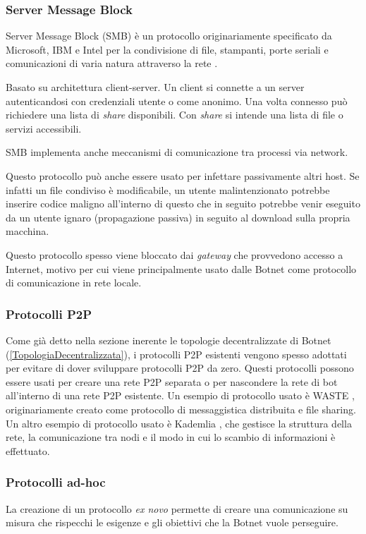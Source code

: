 \subsubsection{Server Message Block}
Server Message Block (SMB) è un protocollo  originariamente specificato da Microsoft, IBM e Intel per la condivisione di file, stampanti, porte seriali e comunicazioni di varia natura attraverso la rete \cite{SMB}.

Basato su architettura client-server. Un client si connette a un server autenticandosi con credenziali utente o come anonimo. Una volta connesso può richiedere una lista di \textit{share} disponibili. Con \textit{share} si intende una lista di file o servizi accessibili.

SMB implementa anche meccanismi di comunicazione tra processi via network.

Questo protocollo può anche essere usato per infettare passivamente altri host. Se infatti un file condiviso è modificabile, un utente malintenzionato potrebbe inserire codice maligno all'interno di questo  che in seguito  potrebbe venir eseguito da un utente ignaro (propagazione passiva) in seguito al download  sulla propria macchina.

Questo protocollo spesso viene bloccato dai \textit{gateway} che provvedono accesso a Internet, motivo per cui viene principalmente usato dalle Botnet come protocollo di comunicazione in rete locale.

\subsubsection{Protocolli P2P}
Come già detto nella sezione inerente le topologie decentralizzate di Botnet (\ref{TopologiaDecentralizzata}), i protocolli P2P esistenti vengono spesso adottati per evitare di dover sviluppare protocolli P2P da zero. Questi protocolli possono  essere usati per creare una rete P2P separata o per nascondere la rete di bot all'interno di una rete P2P esistente.
Un esempio di protocollo usato è WASTE \cite{WASTE}, originariamente creato come protocollo di messaggistica distribuita e file sharing. Un altro esempio di protocollo usato è Kademlia \cite{maymounkov2002kademlia}, che gestisce la struttura della rete, la comunicazione tra nodi e il modo in cui lo scambio di informazioni è effettuato.

\subsubsection{Protocolli ad-hoc}
La creazione di un protocollo \textit{ex novo} permette di creare una comunicazione su misura che rispecchi le esigenze e gli obiettivi che la Botnet vuole perseguire. 

